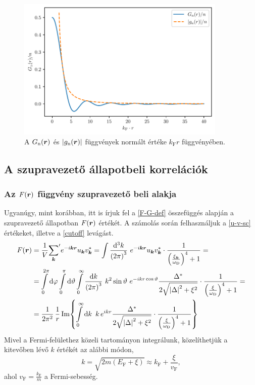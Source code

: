 \documentclass[a4paper,12pt,titlepage]{article}
\newcommand{\KK}{{\vb*{k}}}
\newcommand{\RR}{{\vb*{r}}}
\newcommand{\kF}{{k_\text{F}}}
\newcommand{\EF}{{E_\text{F}}}
\newcommand{\vF}{{v_\text{F}}}
\begin{document}
\begin{figure}[h!]
	\centering
	\includegraphics[width=10cm]{G_normal.pdf}
	\caption{A $G_\text{n}(\RR)$ és $\left| g_\text{n}(\RR) \right|$ függvények normált értéke $\kF r$ függvényében.}
	\label{G-normal-fig}
\end{figure}


\subsection{A szupravezető állapotbeli korrelációk}

\subsubsection{Az $F(\RR)$ függvény szupravezető beli alakja}

Ugyanúgy, mint korábban, itt is írjuk fel a \eqref{F-G-def} összefüggés alapján a szupravezető állapotban $F(\RR)$ értékét.  A számolás során felhasználjuk a \eqref{u-v-sc} értékeket, illetve a \eqref{cutoff} levágást.
\begin{equation}
\begin{split}
	F(\RR) & = \frac{1}{V} {\sum\limits_\KK}^\prime e^{-i \KK \RR} u_\KK v_\KK^* = \int \frac{\dd[3]k}{\left( 2 \pi \right)^3} ~ e^{-i \KK \RR} u_\KK v_\KK^* \cdot \frac{1}{\left( \frac{\xi_\KK}{\omega_\text{D}} \right)^4 + 1} = \\
	& = \int\limits_0^{2 \pi} \dd{\varphi} \int\limits_0^\pi \dd{\vartheta} \int\limits_0^\infty \frac{\dd{k}}{\left( 2 \pi \right)^3} ~ k^2 \sin\vartheta ~ e^{-i k r \cos\vartheta} \frac{\Delta^*}{2 \sqrt{\left| \Delta \right|^2 + \xi^2}} \cdot \frac{1}{\left( \frac{\xi}{\omega_\text{D}} \right)^4 + 1} = \\
	& = \frac{1}{2 \pi^2} \, \frac{1}{r} \Im{ \int\limits_0^\infty \dd{k} ~ k \, e^{i k r} \frac{\Delta^*}{2 \sqrt{\left| \Delta \right|^2 + \xi^2}} \cdot \frac{1}{\left( \frac{\xi}{\omega_\text{D}} \right)^4 + 1} }
\end{split}
\end{equation}
Mivel a Fermi-felülethez közeli tartományon integrálunk, közelíthetjük a kitevőben lévő $k$ értékét az alábbi módon,
\begin{equation} \label{k-xi-approx}
	k = \sqrt{2 m \left( \EF + \xi \right)} \approx \kF + \frac{\xi}{\vF},
\end{equation}
ahol $\vF = \frac{\kF}{m}$ a Fermi-sebesség.
\end{document}
